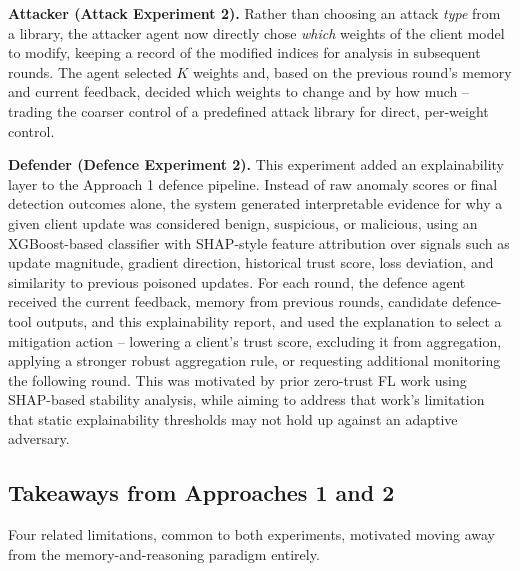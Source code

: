 \textbf{Attacker (Attack Experiment 2).} Rather than choosing an attack \emph{type} from a library, the attacker agent now directly chose \emph{which} weights of the client model to modify, keeping a record of the modified indices for analysis in subsequent rounds. The agent selected $K$ weights and, based on the previous round's memory and current feedback, decided which weights to change and by how much -- trading the coarser control of a predefined attack library for direct, per-weight control.

\textbf{Defender (Defence Experiment 2).} This experiment added an explainability layer to the Approach 1 defence pipeline. Instead of raw anomaly scores or final detection outcomes alone, the system generated interpretable evidence for why a given client update was considered benign, suspicious, or malicious, using an XGBoost-based classifier with SHAP-style feature attribution over signals such as update magnitude, gradient direction, historical trust score, loss deviation, and similarity to previous poisoned updates. For each round, the defence agent received the current feedback, memory from previous rounds, candidate defence-tool outputs, and this explainability report, and used the explanation to select a mitigation action -- lowering a client's trust score, excluding it from aggregation, applying a stronger robust aggregation rule, or requesting additional monitoring the following round. This was motivated by prior zero-trust FL work using SHAP-based stability analysis, while aiming to address that work's limitation that static explainability thresholds may not hold up against an adaptive adversary.

\subsection{Takeaways from Approaches 1 and 2}
\label{sec:method-takeaways}
Four related limitations, common to both experiments, motivated moving away from the memory-and-reasoning paradigm entirely.

